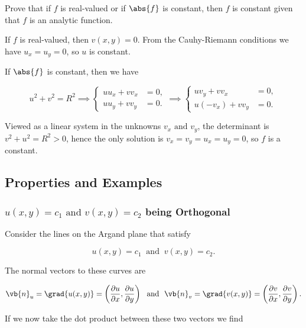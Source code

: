 \documentclass[english,a4paper,12pt]{report}
\begin{document}
{Prove that if \(f\) is real-valued or if \(\abs{f} \) is constant, then \(f\) is constant given that \(f\) is an analytic function.}
{If \(f\) is real-valued, then \(v(x,y) = 0\). From the Cauhy-Riemann conditions we have \(u_{x} = u_{y} = 0  \), so \(u\) is constant. 

If \(\abs{f} \) is constant, then we have 

\begin{equation}
    u^2+v^2=R^2 \implies \begin{cases}
        u u_{x}+v v_{x} &=0,\\
        u u_{y} + v v_{y} &= 0.
    \end{cases} \implies 
    \begin{cases}
        uv_{y}+v v_{x} &=0,\\
        u(-v_{x} )+v v_{y} &=0 .
    \end{cases}  
\end{equation}

Viewed as a linear system in the unknowns \(v_{x}\text { and } v_{y}  \), the determinant is \(v^2+u^2=R^2 > 0\), hence the only solution is \(v_{x}=v_{y}=u_{x}=u_{y}=0   \), so \(f\) is a constant.   
} 


\subsection{Properties and Examples}

\subsubsection{\(u(x,y) = c_1 \text { and } v(x,y) = c_2 \) being Orthogonal}

Consider the lines on the Argand plane that satisfy 

\begin{equation}
    u(x,y) = c_1 ~\text { and }~ v(x,y) = c_2.
\end{equation}

The normal vectors to these curves are 

\begin{equation}
    \vb{n} _{u} = \grad{u(x,y)} = \left( \frac{\partial u}{\partial x} , \frac{\partial u}{\partial y}  \right) ~\text { and }~ \vb{n} _{v} = \grad{v(x,y)} = \left( \frac{\partial v}{\partial x} , \frac{\partial v}{\partial y}  \right).
\end{equation}

If we now take the dot product between these two vectors we find 
\end{document}
